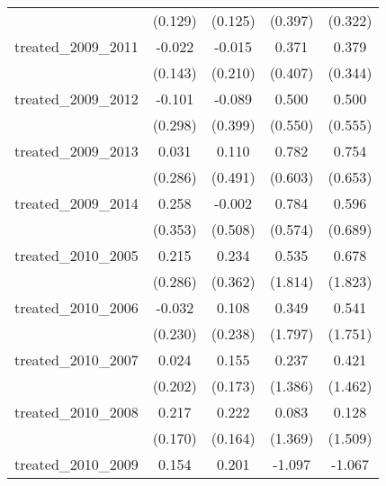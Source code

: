 {\begin{tabular}{l*{4}{c}}
            &     (0.129)         &     (0.125)         &     (0.397)         &     (0.322)         \\
[1em]
treated\_2009\_2011&      -0.022         &      -0.015         &       0.371         &       0.379         \\
            &     (0.143)         &     (0.210)         &     (0.407)         &     (0.344)         \\
[1em]
treated\_2009\_2012&      -0.101         &      -0.089         &       0.500         &       0.500         \\
            &     (0.298)         &     (0.399)         &     (0.550)         &     (0.555)         \\
[1em]
treated\_2009\_2013&       0.031         &       0.110         &       0.782         &       0.754         \\
            &     (0.286)         &     (0.491)         &     (0.603)         &     (0.653)         \\
[1em]
treated\_2009\_2014&       0.258         &      -0.002         &       0.784         &       0.596         \\
            &     (0.353)         &     (0.508)         &     (0.574)         &     (0.689)         \\
[1em]
treated\_2010\_2005&       0.215         &       0.234         &       0.535         &       0.678         \\
            &     (0.286)         &     (0.362)         &     (1.814)         &     (1.823)         \\
[1em]
treated\_2010\_2006&      -0.032         &       0.108         &       0.349         &       0.541         \\
            &     (0.230)         &     (0.238)         &     (1.797)         &     (1.751)         \\
[1em]
treated\_2010\_2007&       0.024         &       0.155         &       0.237         &       0.421         \\
            &     (0.202)         &     (0.173)         &     (1.386)         &     (1.462)         \\
[1em]
treated\_2010\_2008&       0.217         &       0.222         &       0.083         &       0.128         \\
            &     (0.170)         &     (0.164)         &     (1.369)         &     (1.509)         \\
[1em]
treated\_2010\_2009&       0.154         &       0.201         &      -1.097         &      -1.067         \\

\end{tabular}}

